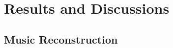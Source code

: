 \documentclass[11pt]{article}
\newcommand{\red}[1]{\textcolor{red}{#1}}
\begin{document}
\section{Results and Discussions}
\label{sec:res}

\subsection{Music Reconstruction}
\label{sec:musrec}

\end{document}
